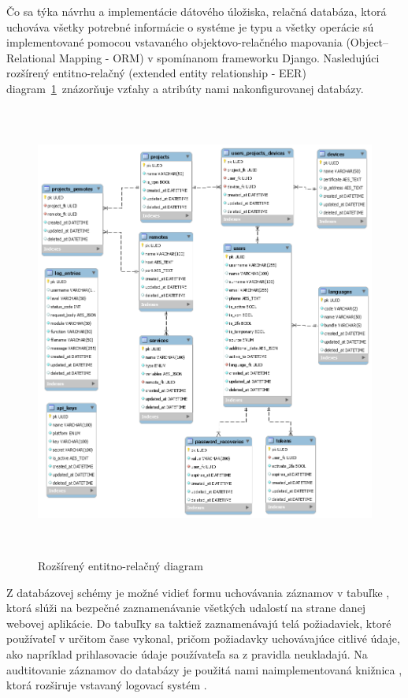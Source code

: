 Čo sa týka návrhu a implementácie dátového úložiska, relačná databáza, ktorá uchováva všetky potrebné informácie o systéme
je typu  a všetky operácie sú implementované pomocou vstavaného objektovo-relačného
mapovania (Object–Relational Mapping - ORM) v spomínanom frameworku Django.
Nasledujúci rozšírený entitno-relačný (extended entity relationship - EER) diagram~\ref{fig:obr_13}~znázorňuje
vzťahy a atribúty nami nakonfigurovanej databázy.

\begin{figure}[H]
\begin{center}\includegraphics[width=\textwidth,height=15cm,keepaspectratio=true]{assets/eer_diagram.png}\end{center}
\caption[Rozšírený entitno-relačný diagram]{Rozšírený entitno-relačný diagram}\label{fig:obr_13}
\end{figure}

Z databázovej schémy je možné vidieť formu uchovávania záznamov v tabuľke , ktorá slúži na bezpečné
zaznamenávanie všetkých udalostí na strane danej webovej aplikácie.
Do tabuľky sa taktiež zaznamenávajú telá požiadaviek, ktoré používateľ v určitom čase vykonal, pričom požiadavky uchovávajúce
citlivé údaje, ako napríklad prihlasovacie údaje používateľa sa z pravidla neukladajú.
Na audtitovanie záznamov do databázy je použitá nami naimplementovaná knižnica , ktorá rozširuje
vstavaný logovací systém .

